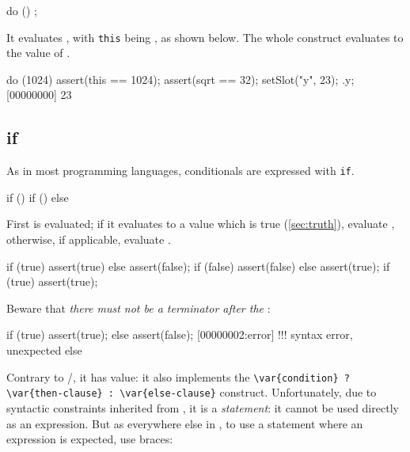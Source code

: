 \begin{urbiunchecked}[frame=, backgroundcolor=, ]
do ()
{
};
\end{urbiunchecked}

It evaluates , with \lstinline|this| being , as
shown below.  The whole construct evaluates to the value
of .

\begin{urbiscript}[firstnumber=last]
do (1024)
{
  assert(this == 1024);
  assert(sqrt == 32);
  setSlot("y", 23);
}.y;
[00000000] 23
\end{urbiscript}


\subsection{if}
\label{sec:lang:if}
As in most programming languages, conditionals are expressed with
\lstinline|if|.

\begin{urbiunchecked}[frame=, backgroundcolor=, ]
if () 
if ()  else 
\end{urbiunchecked}

First  is evaluated; if it evaluates to a value which
is true (\autoref{sec:truth}), evaluate , otherwise,
if applicable, evaluate .

\begin{urbiscript}[firstnumber=last]
if (true) assert(true) else assert(false);
if (false) assert(false) else assert(true);
if (true) assert(true);
\end{urbiscript}

Beware that \emph{there must not be a terminator after the
  }:

\begin{urbiscript}[firstnumber=last]
if (true)
  assert(true);
else
  assert(false);
[00000002:error] !!! syntax error, unexpected else
\end{urbiscript}

Contrary to \C/\Cxx, it has value: it also implements the
\lstinline|\var{condition} ? \var{then-clause} : \var{else-clause}|
construct.  Unfortunately, due to syntactic constraints inherited from
\C, it is a \emph{statement}: it cannot be used directly as an
expression.  But as everywhere else in \us, to use a statement where
an expression is expected, use braces:

